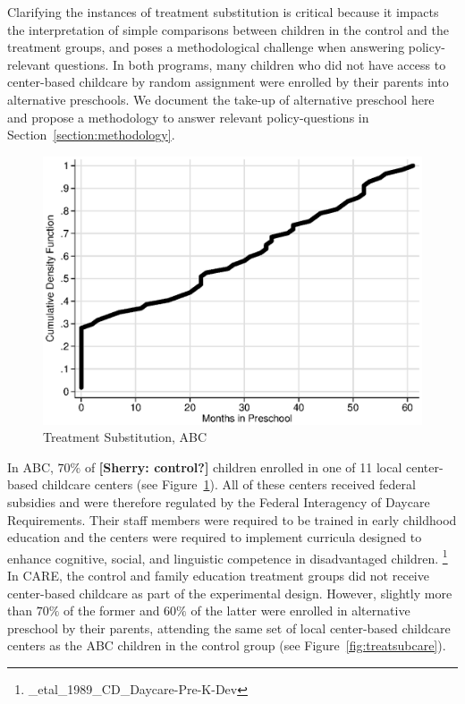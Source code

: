 \noindent Clarifying the instances of treatment substitution is critical because it impacts the interpretation of simple comparisons between children in the control and the treatment groups, and poses a methodological challenge when answering policy-relevant questions.
In both programs, many children who did not have access to center-based childcare by random assignment were enrolled by their parents into alternative preschools. We document the take-up of alternative preschool here and propose a methodology to answer relevant policy-questions in Section~\ref{section:methodology}.\\

\begin{figure}[H]
		\caption{Treatment Substitution, ABC} \label{fig:treatsubabc}
		\includegraphics[width=.9\columnwidth]{output/abc_controlcontamination_months.eps}
\end{figure}

\noindent In ABC, $70\%$ of \textbf{[Sherry: control?]} children enrolled in one of 11 local center-based childcare centers (see Figure~\ref{fig:treatsubabc}). All of these centers received federal subsidies and were therefore regulated by the Federal Interagency of Daycare Requirements. Their staff members were required to be trained in early childhood education and the centers were required to implement curricula designed to enhance cognitive, social, and linguistic competence in disadvantaged children. \footnote{{\citetBurchinal_etal_1989_CD_Daycare-Pre-K-Dev}} In CARE, the control and family education treatment groups did not receive center-based childcare as part of the experimental design. However, slightly more than $70\%$ of the  former and $60\%$ of the latter were enrolled in alternative preschool by their parents, attending the same set of local center-based childcare centers as the ABC children in the control group (see Figure~\ref{fig:treatsubcare}).\\

